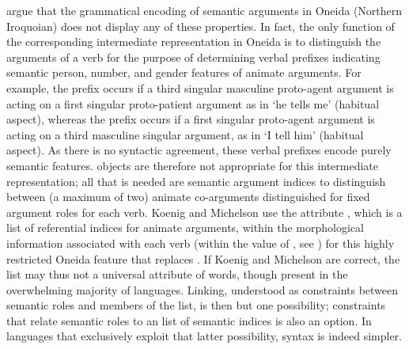\documentclass[output=paper
                ,modfonts
                ,nonflat
	        ,collection
	        ,collectionchapter
	        ,collectiontoclongg
 	        ,biblatex
                ,babelshorthands
                ,newtxmath
                ,draftmode
                ,colorlinks, citecolor=brown
]{./langsci/langscibook}
\begin{document}
\citet{KoenigandMichelson2014,KoenigandMichelson2015a,KoenigandMichelson2015b} argue that the grammatical encoding of semantic arguments in Oneida (Northern Iroquoian)  does not display any of these properties.  In fact, the only function of the
corresponding intermediate representation in Oneida is to distinguish
the arguments of a verb for the purpose of determining verbal
prefixes indicating semantic person, number, and gender
features of animate arguments.  
For example,  the prefix  occurs if a third singular masculine proto-agent argument is acting on a first singular proto-patient argument as in   `he tells me’ (habitual aspect), whereas  the prefix  occurs if a first singular proto-agent argument is acting on a third masculine singular argument, as in  `I tell him’ (habitual aspect).
 As there is no syntactic agreement, these verbal prefixes encode purely semantic features.
 objects are therefore not appropriate for this intermediate
representation; all that is needed are semantic argument indices to
distinguish between (a maximum of two) animate co-arguments
distinguished for fixed argument roles for each verb.
Koenig and Michelson use the attribute , which is a list of referential indices for animate arguments, within the morphological information associated with each verb (within the value of , see ) for this highly restricted
Oneida feature that replaces \argst. If Koenig and Michelson are correct, the \argst list may thus not a universal attribute of words, though present in the overwhelming majority of languages.
Linking, understood as constraints between semantic roles and members of the \argst list, is then but one possibility; constraints that relate semantic roles to an  list of semantic indices is also an option.
In languages that exclusively exploit that latter possibility, syntax is indeed simpler.
\end{document}
